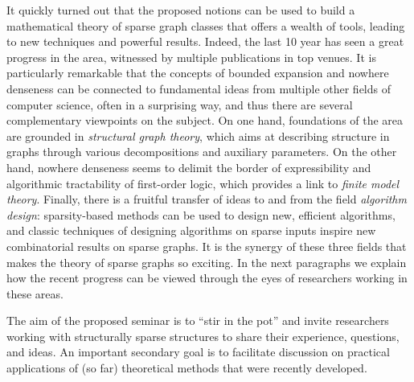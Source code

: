 It quickly turned out that the proposed notions can be used to build a mathematical theory of sparse graph classes that offers a wealth of tools, leading to new techniques and powerful results.
Indeed, the last 10 year has seen a great progress in the area, witnessed by multiple publications in top venues.
It is particularly remarkable that the concepts of bounded expansion and nowhere denseness can be connected 
to fundamental ideas from multiple other fields of computer science, often in a surprising way, and thus there are several complementary viewpoints on the subject. 
On one hand, foundations of the area are grounded in {\em{structural graph theory}}, which aims at describing structure in graphs through various decompositions and auxiliary parameters.
On the other hand, nowhere denseness seems to delimit the border of expressibility and algorithmic tractability of first-order logic, which provides a link to {\em{finite model theory}}.
Finally, there is a fruitful transfer of ideas to and from the field {\em{algorithm design}}: sparsity-based methods can be used to design new, efficient algorithms, 
and classic techniques of designing algorithms on sparse inputs inspire new combinatorial results on sparse graphs.
It is the synergy of these three fields that makes the theory of sparse graphs so exciting.
In the next paragraphs we explain how the recent progress can be viewed through the eyes of researchers working in these areas.

The aim of the proposed seminar is to ``stir in the pot'' and invite researchers working with structurally sparse structures to share their experience, questions, and ideas.
An important secondary goal is to facilitate discussion on practical applications of (so far) theoretical methods that were recently developed.

